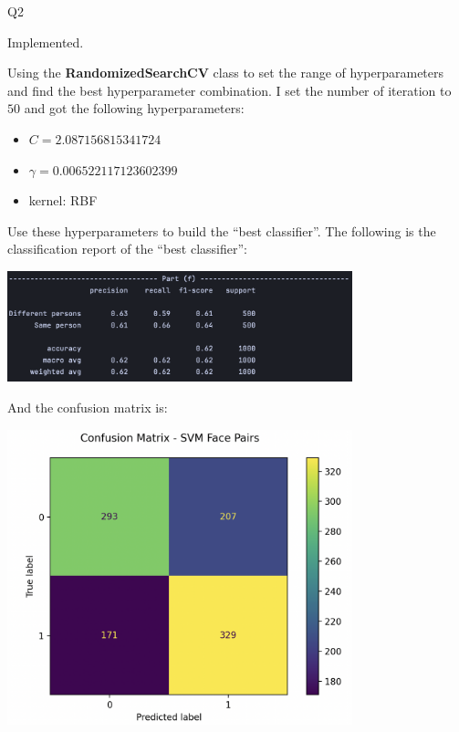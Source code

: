 \question Q2\droppoints

\begin{solution}
     Implemented.

     Using the \textbf{RandomizedSearchCV} class to set the range of hyperparameters and find the best hyperparameter combination.
    I set the number of iteration to $50$ and got the following hyperparameters:

    \begin{itemize}
        \item { $C = 2.087156815341724$ }
        \item { $\gamma = 0.006522117123602399$ }
        \item { kernel: RBF }
    \end{itemize}

    Use these hyperparameters to build the ``best classifier''.
    The following is the classification report of the ``best classifier'':

    \vspace{12pt}
    \centerline {
        \includegraphics[width=0.75\textwidth]{img/q2_report}
    }

    And the confusion matrix is:

    \vspace{12pt}
    \centerline {
        \includegraphics[width=0.75\textwidth]{img/q2_confusion_matrix}
    }


\end{solution}
